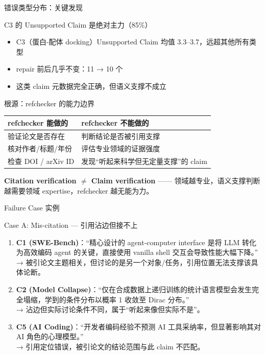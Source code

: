 \documentclass[UTF8,fontset=fandol,aspectratio=169]{ctexbeamer}
\begin{document}
\begin{frame}{错误类型分布：关键发现}
  \begin{alertblock}{C3 的 Unsupported Claim 是绝对主力（85\%）}
    \begin{itemize}
      \item C3（蛋白-配体 docking）Unsupported Claim 均值 3.3--3.7，远超其他所有类型
      \item repair 前后几乎不变：11 → 10 个
      \item 这类 claim 元数据完全正确，但语义支撑不成立
    \end{itemize}
  \end{alertblock}

  \vspace{0.3em}
  \begin{block}{根源：refchecker 的能力边界}
    \begin{center}
    \begin{tabular}{p{}|p{}}
      \textbf{refchecker 能做的} & \textbf{refchecker 不能做的} \\
      \hline
      验证论文是否存在 & 判断结论是否被引用支撑 \\
      核对作者/标题/年份 & 评估专业领域的证据强度 \\
      检查 DOI / arXiv ID & 发现“听起来科学但无定量支撑”的 claim \\
    \end{tabular}
    \end{center}
  \end{block}

  \textbf{Citation verification $\neq$ Claim verification} —— 领域越专业，语义支撑判断越需要领域 expertise，refchecker 越无能为力。
\end{frame}

\begin{frame}{Failure Case 实例}
  \begin{block}{Case A: Mis-citation — 引用沾边但接不上}
    \begin{enumerate}
      \setlength{\itemsep}{4pt}
      \item \textbf{C1 (SWE-Bench)}：“精心设计的 agent-computer interface 是将 LLM 转化为高效编码 agent 的关键，直接使用 vanilla shell 交互会导致性能大幅下降。”
      \\→ 被引论文主题相关，但讨论的是另一个对象/任务，引用位置无法支撑该具体论断。

      \item \textbf{C2 (Model Collapse)}：“仅在合成数据上递归训练的统计语言模型会发生完全塌缩，学到的条件分布以概率 1 收敛至 Dirac 分布。”
      \\→ 沾边但实际讨论条件不同，属于“听起来像但实际不是”。

      \item \textbf{C5 (AI Coding)}：“开发者编码经验不预测 AI 工具采纳率，但显著影响其对 AI 角色的心理模型。”
      \\→ 引用定位错误，被引论文的结论范围与此 claim 不匹配。
    \end{enumerate}
  \end{block}
\end{frame}
\end{document}

